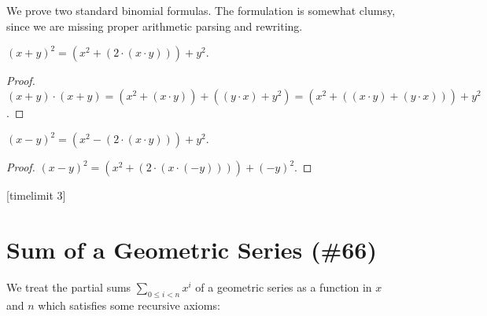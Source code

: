 \documentclass{article}
\begin{document}
%
We prove two standard binomial formulas. The formulation is
somewhat clumsy, since we are missing proper arithmetic
parsing and rewriting.
%
\begin{forthel}
[timelimit 10]
\begin{lemma}
$(x + y)^{2} = (x^{2} + (2 \cdot (x \cdot y))) + y^{2}$.
\end{lemma}
\begin{proof}
$(x + y) \cdot (x + y) =
(x^{2} + (x \cdot y)) + ((y \cdot x) + y^{2}) = 
(x^{2} + ((x \cdot y) + (y \cdot x))) + y^{2}$.
\end{proof}

\begin{lemma}
$(x - y)^{2} = (x^{2} - (2 \cdot (x \cdot y))) + y^{2}$.
\end{lemma}
\begin{proof}
$(x - y)^{2} = (x^{2} + (2 \cdot (x \cdot (-y)))) + (-y)^{2}$.
\end{proof}
[timelimit 3]
\end{forthel}


\section{Sum of a Geometric Series (\#66)}

\newcommand{\sumgeom}[2]{\sum_{0 \leq i < #2} {#1}^i}


We treat the partial sums $\sumgeom{x}{n}$ of a geometric
series as a function in $x$ and $n$ which satisfies some
recursive axioms:
\end{document}
